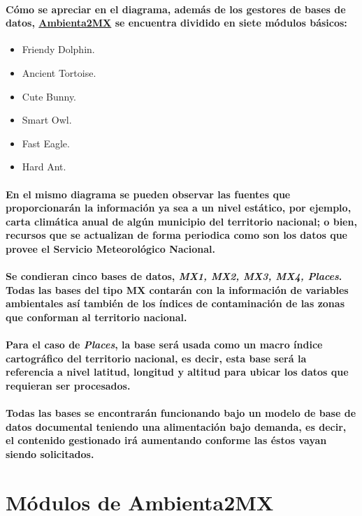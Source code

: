     \paragraph{Cómo se apreciar en el diagrama, además de los gestores de bases de datos, \underline{Ambienta2MX} se encuentra dividido en siete módulos básicos:}
    \begin{itemize}
    \item Friendy Dolphin.
    \item Ancient Tortoise.
    \item Cute Bunny.
    \item Smart Owl.
    \item Fast Eagle.
    \item Hard Ant.
  \end{itemize}
    \paragraph{En el mismo diagrama se pueden observar las fuentes que proporcionarán la información ya sea a un nivel estático, por ejemplo, carta climática anual de algún municipio del territorio nacional; o bien, recursos que se actualizan de forma periodica como son los datos que provee el Servicio Meteorológico Nacional.}
    \paragraph{Se condieran cinco bases de datos, \emph{MX1, MX2, MX3, MX4, Places}. Todas las bases del tipo MX contarán con la información de variables ambientales así también de los índices de contaminación de las zonas que conforman al territorio nacional.}
    \paragraph{Para el caso de \emph{Places}, la base será usada como un macro índice cartográfico del territorio nacional, es decir, esta base será la referencia a nivel latitud, longitud y altitud para ubicar los datos que requieran ser procesados.}
    \paragraph{Todas las bases se encontrarán funcionando bajo un modelo de base de datos documental teniendo una alimentación bajo demanda, es decir, el contenido gestionado irá aumentando conforme las éstos vayan siendo solicitados.}
\section{Módulos de Ambienta2MX}
